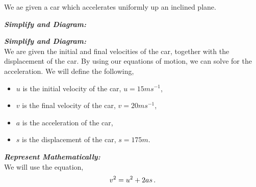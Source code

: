 %
%
%


\begin{subquestions}
	
\subquestion
We ae given a car which accelerates uniformly up an inclined plane.

\begin{subsubquestions}
	
\subsubquestion

\textbf{\textit{Simplify and Diagram:}} \\ 
	

\subsubquestion

\textbf{\textit{Simplify and Diagram:}} \\
We are given the initial and final velocities of the car, together with the displacement of the car. By using our equations of motion, we can solve for the acceleration.
We will define the following,
\begin{itemize}
	\item $u$ is the initial velocity of the car, $u=15ms^{-1}$,
	\item $v$ is the final velocity of the car, $v=20ms^{-1}$,
	\item $a$ is the acceleration of the car,
	\item $s$ is the displacement of the car, $s=175m$.
\end{itemize}




\textbf{\textit{Represent Mathematically:}} \\
We will use the equation,
\begin{equation}
	v^2 = u^2 + 2as \,. \label{2011:q5:AEqn1} \\	
\end{equation}





\end{subsubquestions}
\end{subquestions}
